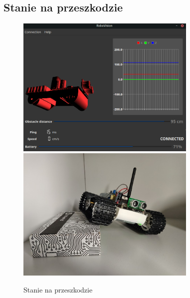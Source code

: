 \documentclass[12pt,a4paper,polish]{article}
\begin{document}
  \subsection{Stanie na przeszkodzie}
  \begin{figure}[h]
    \centering
    \includegraphics[width=0.77\textwidth]{img/final/2.png}
    \includegraphics[width=0.77\textwidth]{img/final/2e.jpg}
    \caption{Stanie na przeszkodzie}
  \end{figure}

  \newpage
\end{document}
